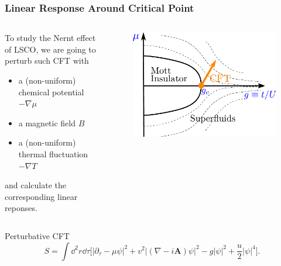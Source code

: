 \documentclass[10pt,aspectratio=43,xcolor=x11names,t]{beamer}%
\begin{document}
		\begin{frame}\frametitle{Linear Response Around Critical Point}
			\begin{columns}
				\begin{column}{0.45\textwidth}
					To study the Nernt effect of LSCO, we are going to perturb such CFT with 
					\begin{itemize}
						\item a (non-uniform) chemical potential $-\nabla\mu$
						\item a magnetic field $B$
						\item a (non-uniform) thermal fluctuation $-\nabla T$
					\end{itemize}
					and calculate the corresponding linear reponses.
				\end{column}
				\begin{column}{0.5\textwidth}
					\begin{figure}[!htp]
						\centering
						\includegraphics[scale=0.4]{CFT.pdf}
					\end{figure}
					
				\end{column}
			\end{columns}

			\begin{block}{Perturbative CFT}
				\begin{equation*}
					S=\int\dd^2r\dd\tau\bigg[|\partial_\tau-\mu\psi|^2+v^2|(\nabla-i\bm{A})\psi|^2-g|\psi|^2+\dfrac{u}{2}|\psi|^4\bigg].
				\end{equation*}
			\end{block}
		\end{frame}
		
\end{document}
